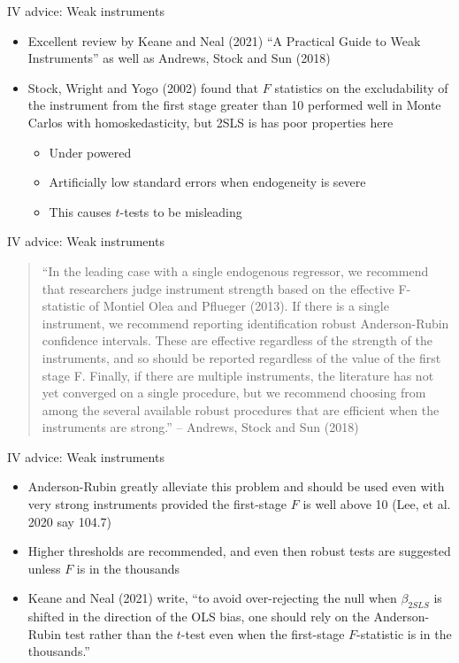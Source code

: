 \documentclass{beamer}
\begin{document}
\begin{frame}{IV advice: Weak instruments}

	\begin{itemize}
	\item Excellent review by Keane and Neal (2021) ``A Practical Guide to Weak Instruments''  as well as Andrews, Stock and Sun (2018)
	\item Stock, Wright and Yogo (2002) found that $F$ statistics on the excludability of the instrument from the first stage greater than 10 performed well in Monte Carlos with homoskedasticity, but 2SLS is has poor properties here
		\begin{itemize}
		\item Under powered
		\item Artificially low standard errors when endogeneity is severe
		\item This causes $t$-tests to be misleading
		\end{itemize}
	\end{itemize}

\end{frame}

\begin{frame}{IV advice: Weak instruments}

\begin{quote}
``In the leading case with a single endogenous regressor, we recommend that researchers judge instrument strength based on the effective F-statistic of Montiel Olea and Pflueger (2013).  If there is a single instrument, we recommend reporting identification robust Anderson-Rubin confidence intervals. These are effective regardless of the strength of the instruments, and so should be reported regardless of the value of the first stage F.  Finally, if there are multiple instruments, the literature has not yet converged on a single procedure, but we recommend choosing from among the several available robust procedures that are efficient when the instruments are strong.'' -- Andrews, Stock and Sun (2018)
\end{quote}

\end{frame}


\begin{frame}{IV advice: Weak instruments}

\begin{itemize}
	\item Anderson-Rubin greatly alleviate this problem and should be used even with very strong instruments provided the first-stage $F$ is well above 10 (Lee, et al. 2020 say 104.7)
	\item Higher thresholds are recommended, and even then robust tests are suggested unless $F$ is in the thousands
	\item Keane and Neal (2021) write, ``to avoid over-rejecting the null when $\beta_{2SLS}$ is shifted in the direction of the OLS bias, one should rely on the Anderson-Rubin test rather than the $t$-test even when the first-stage $F$-statistic is in the thousands.'' 
\end{itemize}

\end{frame}
\end{document}
